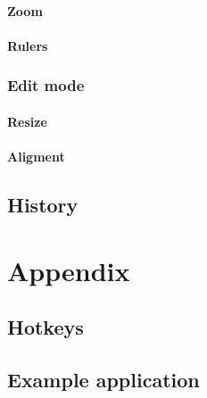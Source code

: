 \documentclass[titlepage,oneside,11pt]{book}
\begin{document}
\subsubsection{Zoom}
\subsubsection{Rulers}
\subsection{Edit mode}
\subsubsection{Resize}
\subsubsection{Aligment}
\section{History}
\chapter{Appendix}
\section{Hotkeys}
\section{Example application}
\end{document}

